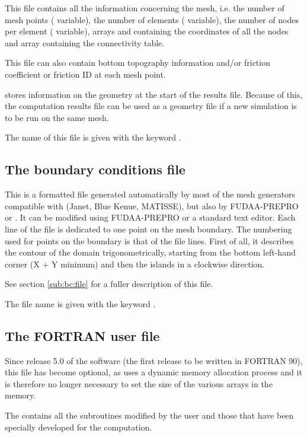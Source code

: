 This file contains all the information concerning the mesh,
i.e. the number of mesh points ( variable),
the number of elements ( variable),
the number of nodes per element ( variable),
arrays  and  containing the coordinates of all the nodes
and array  containing the connectivity table.

This file can also contain bottom topography information and/or
friction coefficient or friction ID at each mesh point.

 stores information on the geometry at the start of the results file.
Because of this, the computation results file can be used as a geometry file
if a new simulation is to be run on the same mesh.

The name of this file is given with the keyword .


\subsection{The boundary conditions file}

This is a formatted file generated automatically by most of the mesh generators
compatible with \tel (Janet, Blue Kenue, MATISSE),
but also by FUDAA-PREPRO or \stbtel.
It can be modified using FUDAA-PREPRO or a standard text editor.
Each line of the file is dedicated to one point on the mesh boundary.
The numbering used for points on the boundary is that of the file lines.
First of all, it describes the contour of the domain trigonometrically,
starting from the bottom left-hand corner (X + Y minimum) and then the islands
in a clockwise direction.

See section \ref{sub:bc:file} for a fuller description of this file.

The file name is given with the keyword .


\subsection{The FORTRAN user file}
\label{subs:FORT:user:file}
Since release 5.0 of the software (the first release to be written in
FORTRAN 90), this file has become optional, as  uses
a dynamic memory allocation process and it is therefore no longer necessary
to set the size of the various arrays in the memory.

The  contains all the  subroutines modified
by the user and those that have been specially developed for the computation.

